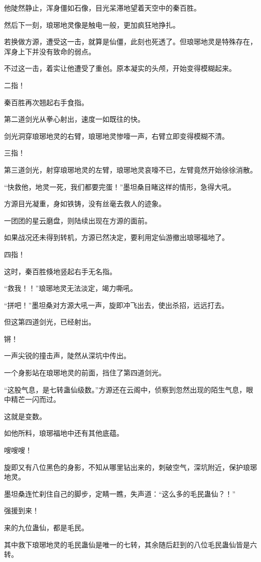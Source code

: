 \begin{this_body}
他陡然静止，浑身僵如石像，目光呆滞地望着天空中的秦百胜。

然后下一刻，琅琊地灵像是触电一般，更加疯狂地挣扎。

若换做方源，遭受这一击，就算是仙僵，此刻也死透了。但琅琊地灵是特殊存在，浑身上下并没有致命的弱点。

不过这一击，着实让他遭受了重创。原本凝实的头颅，开始变得模糊起来。

二指！

秦百胜再次翘起右手食指。

第二道剑光从拳心射出，速度一如既往的快。

剑光洞穿琅琊地灵的右臂，琅琊地灵惨嚎一声，右臂立即变得模糊不清。

三指！

第三道剑光，射穿琅琊地灵的左臂，琅琊地灵哀嚎不已，左臂竟然开始徐徐消散。

“快救他，地灵一死，我们都要完蛋！”墨坦桑目睹这样的情形，急得大吼。

方源目光凝重，身如铁铸，没有丝毫去救人的迹象。

一团团的星云磨盘，则陆续出现在方源的面前。

如果战况还未得到转机，方源已然决定，要利用定仙游撤出琅琊福地了。

四指！

这时，秦百胜倏地竖起右手无名指。

“救我！！”琅琊地灵无法淡定，竭力嘶吼。

“拼吧！”墨坦桑对方源大吼一声，旋即冲飞出去，使出杀招，远远打去。

但这第四道剑光，已经射出。

锵！

一声尖锐的撞击声，陡然从深坑中传出。

一个身影站在琅琊地灵的前面，挡住了第四道剑光。

“这股气息，是七转蛊仙级数。”方源还在云阁中，侦察到忽然出现的陌生气息，眼中精芒一闪而过。

这就是变数。

如他所料，琅琊福地中还有其他底蕴。

嗖嗖嗖！

旋即又有八位黑色的身影，不知从哪里钻出来的，刺破空气，深坑附近，保护琅琊地灵。

墨坦桑连忙刹住自己的脚步，定睛一瞧，失声道：“这么多的毛民蛊仙？！”

强援到来！

来的九位蛊仙，都是毛民。

其中救下琅琊地灵的毛民蛊仙是唯一的七转，其余随后赶到的八位毛民蛊仙皆是六转。


\end{this_body}
